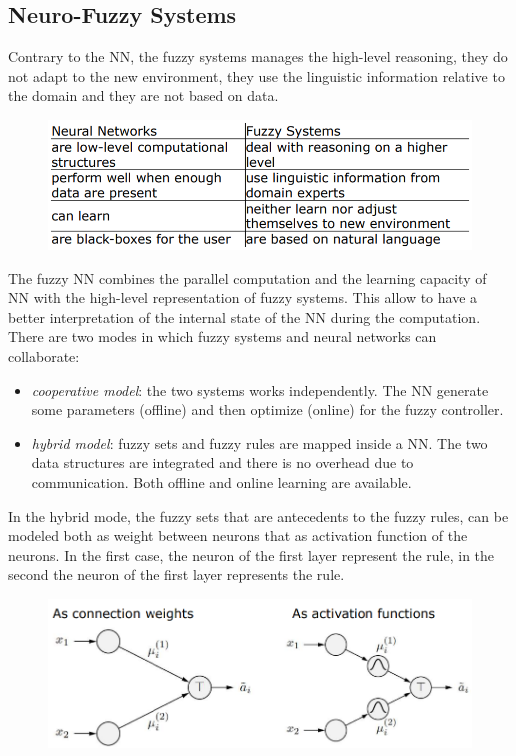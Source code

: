 \documentclass{article}
\begin{document}
\subsection{Neuro-Fuzzy Systems}
Contrary to the NN, the fuzzy systems manages the high-level reasoning, they do not adapt to the new
environment, they use the linguistic information relative to the domain and they are not based on
data.
\begin{figure}[H]
    \centering
    \includegraphics[scale=0.5]{images/nnvsfuzzy.png}
\end{figure}
The fuzzy NN combines the parallel computation and the learning capacity of NN with the
high-level representation of fuzzy systems. This allow to have a better interpretation of the internal
state of the NN during the computation. There are two modes in which fuzzy systems and neural networks
can collaborate:
\begin{itemize}
    \item \textit{cooperative model}: the two systems works independently. The NN generate some parameters
          (offline) and then optimize (online) for the fuzzy controller.
    \item \textit{hybrid model}: fuzzy sets and fuzzy rules are mapped inside a NN. The two data
          structures are integrated and there is no overhead due to communication. Both offline and online
          learning are available.
\end{itemize}
In the hybrid mode, the fuzzy sets that are antecedents to the fuzzy rules, can be modeled both as weight
between neurons that as activation function of the neurons. In the first case, the neuron of the first
layer represent the rule, in the second the neuron of the first layer represents the rule.
\begin{figure}[H]
    \centering
    \includegraphics[scale=0.5]{images/nnfzconnactiv.png}
\end{figure}
\end{document}
